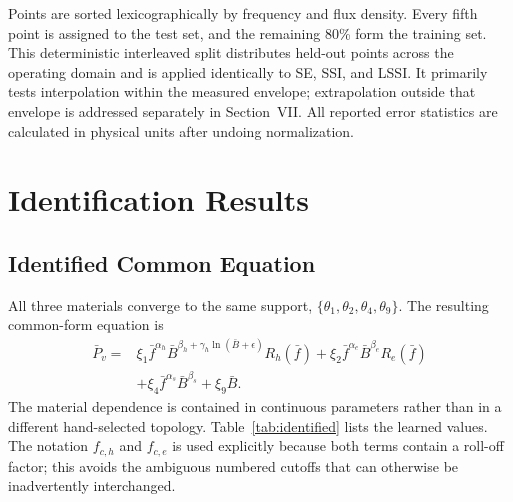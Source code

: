 \documentclass[lettersize,journal]{IEEEtran}
\newcommand{\fbar}{\bar{f}}
\newcommand{\Bbar}{\bar{B}}
\newcommand{\Pbar}{\bar{P}_{v}}
\begin{document}
Points are sorted lexicographically by frequency and flux density. Every fifth point is assigned to the test set, and the remaining 80\% form the training set. This deterministic interleaved split distributes held-out points across the operating domain and is applied identically to SE, SSI, and LSSI. It primarily tests interpolation within the measured envelope; extrapolation outside that envelope is addressed separately in Section~VII. All reported error statistics are calculated in physical units after undoing normalization.

\section{Identification Results}
\subsection{Identified Common Equation}

All three materials converge to the same support, $\{\theta_1,\theta_2,\theta_4,\theta_9\}$. The resulting common-form equation is
\begin{align}
 \Pbar={}&\xi_1\fbar^{\alpha_h}
 \Bbar^{\beta_h+\gamma_h\ln(\Bbar+\epsilon)}R_h(\fbar)
 +\xi_2\fbar^{\alpha_e}\Bbar^{\beta_e}R_e(\fbar) \nonumber\\
 &+\xi_4\fbar^{\alpha_s}\Bbar^{\beta_s}+\xi_9\Bbar.
 \label{eq:identified}
\end{align}
The material dependence is contained in continuous parameters rather than in a different hand-selected topology. Table~\ref{tab:identified} lists the learned values. The notation $f_{c,h}$ and $f_{c,e}$ is used explicitly because both terms contain a roll-off factor; this avoids the ambiguous numbered cutoffs that can otherwise be inadvertently interchanged.

\begin{table}[t]
\centering
\caption{Identified Four-Term LSSI Parameters}
\label{tab:identified}
\renewcommand{\arraystretch}{1.1}
\end{table}
\end{document}
